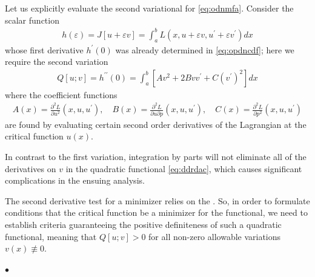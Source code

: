\documentclass{article}
\begin{document}
Let us explicitly evaluate the second variational for \cref{eq:odnmfa}. Consider the scalar function
\begin{align*}
h(\varepsilon)=J[u+\varepsilon v]=\int_{a}^{b} L\left(x, u+\varepsilon v, u^{\prime}+\varepsilon v^{\prime}\right) d x
\end{align*}
whose first derivative $h^{\prime}(0)$ was already determined in \cref{eq:opdncdf}; here we require the second variation
\begin{align}
Q[u ; v]=h^{\prime \prime}(0)=\int_{a}^{b}\left[A v^{2}+2 B v v^{\prime}+C\left(v^{\prime}\right)^{2}\right] d x\label{eq:ddrdac}
\end{align}
where the coefficient functions
\begin{align}
A(x)=\frac{\partial^{2} L}{\partial u^{2}}\left(x, u, u^{\prime}\right), \quad B(x)=\frac{\partial^{2} L}{\partial u \partial p}\left(x, u, u^{\prime}\right), \quad C(x)=\frac{\partial^{2} L}{\partial p^{2}}\left(x, u, u^{\prime}\right)
\end{align}
are found by evaluating certain second order derivatives of the Lagrangian at the critical function $u(x)$.
\begin{rema}
In contrast to the first variation, integration by parts will not eliminate all of the derivatives on $v$ in the quadratic functional \cref{eq:ddrdac}, which causes significant complications in the ensuing analysis.
\end{rema}
The second derivative test for a minimizer relies on the . So, in order to formulate conditions that the critical function be a minimizer for the functional, we need to establish criteria guaranteeing the positive definiteness of such a quadratic functional, meaning that $Q[u ; v]>0$ for all non-zero allowable variations $v(x) \not \equiv 0$. 

$\bullet$ 
\end{document}
